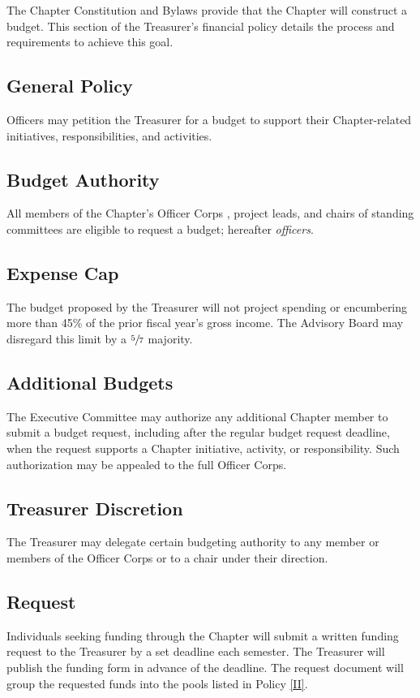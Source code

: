 The Chapter Constitution and Bylaws provide that the Chapter will construct a budget. 
This section of the Treasurer’s financial policy details the process and requirements to achieve this goal.

\subsection{General Policy} \label{I.1}
Officers may petition the Treasurer for a budget to support their Chapter-related initiatives, responsibilities, and activities.

\subsection{Budget Authority} \label{I.2}
All members of the Chapter’s Officer Corps , project leads, and chairs of standing committees are eligible to request a budget; hereafter \textit{officers}.

\subsection{Expense Cap} \label{I.3}
The budget proposed by the Treasurer will not project spending or encumbering more than 45\% of the prior fiscal year’s gross income. 
The Advisory Board may disregard this limit by a $\sfrac{5}{7}$ majority.

\subsection{Additional Budgets} \label{I.4}
The Executive Committee may authorize any additional Chapter member to submit a budget request, including after the regular budget request deadline, when the request supports a Chapter initiative, activity, or responsibility. 
Such authorization may be appealed to the full Officer Corps.

\subsection{Treasurer Discretion} \label{I.5}
The Treasurer may delegate certain budgeting authority to any member or members of the Officer Corps or to a chair under their direction.

\subsection{Request} \label{I.6}
Individuals seeking funding through the Chapter will submit a written funding request to the Treasurer by a set deadline each semester. 
The Treasurer will publish the funding form in advance of the deadline. The request document will group the requested funds into the pools listed in Policy \ref{II}.

